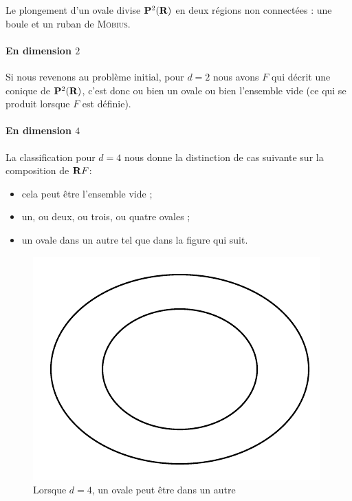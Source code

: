 \documentclass{livre}
\begin{document}
Le plongement d'un ovale divise $\mathbf{P}^{2}(\mathbf{R})$ en deux régions non connectées : une boule et un ruban de \textsc{Möbius}.

\paragraph{En dimension $2$}Si nous revenons au problème initial, pour $d=2$ nous avons $F$ qui décrit une conique de $\mathbf{P}^{2}(\mathbf{R})$, c'est donc ou bien un ovale ou bien l'ensemble vide (ce qui se produit lorsque $F$ est définie).


\paragraph{En dimension $4$}La classification pour $d=4$ nous donne la distinction de cas suivante sur la composition de $\mathbf{R} F$:
\begin{itemize}
\item cela peut être l'ensemble vide ;
\item un, ou deux, ou trois, ou quatre ovales ;
\item un ovale dans un autre tel que dans la figure qui suit.
\end{itemize}

\begin{figure}[H]
\begin{center}
\includegraphics[scale=0.6]{Figures/fig1}
\end{center}
\caption{Lorsque $d=4$, un ovale peut être dans un autre}\label{fig1}
\end{figure}
\end{document}
